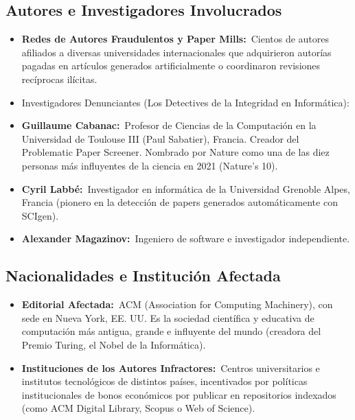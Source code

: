 \documentclass[12pt,a4paper]{article}
\newcommand{\itemlabel}[3]{\textbf{#1#2}~#3}
\begin{document}
\subsection{Autores e Investigadores Involucrados}
\begin{itemize}
\item \itemlabel{Redes de Autores Fraudulentos y \textquotedbl{}Paper Mills\textquotedbl{}}{:}{Cientos de autores afiliados a diversas universidades internacionales que adquirieron autorías pagadas en artículos generados artificialmente o coordinaron revisiones recíprocas ilícitas.}
\item Investigadores Denunciantes (Los Detectives de la Integridad en Informática):
\item \itemlabel{Guillaume Cabanac}{:}{Profesor de Ciencias de la Computación en la Universidad de Toulouse III (Paul Sabatier), Francia. Creador del Problematic Paper Screener. Nombrado por Nature como una de las diez personas más influyentes de la ciencia en 2021 (Nature's 10).}
\item \itemlabel{Cyril Labbé}{:}{Investigador en informática de la Universidad Grenoble Alpes, Francia (pionero en la detección de papers generados automáticamente con SCIgen).}
\item \itemlabel{Alexander Magazinov}{:}{Ingeniero de software e investigador independiente.}
\end{itemize}
\subsection{Nacionalidades e Institución Afectada}
\begin{itemize}
\item \itemlabel{Editorial Afectada}{:}{ACM (Association for Computing Machinery), con sede en Nueva York, EE. UU. Es la sociedad científica y educativa de computación más antigua, grande e influyente del mundo (creadora del Premio Turing, el \textquotedbl{}Nobel de la Informática\textquotedbl{}).}
\item \itemlabel{Instituciones de los Autores Infractores}{:}{Centros universitarios e institutos tecnológicos de distintos países, incentivados por políticas institucionales de bonos económicos por publicar en repositorios indexados (como ACM Digital Library, Scopus o Web of Science).}
\end{itemize}
\end{document}
